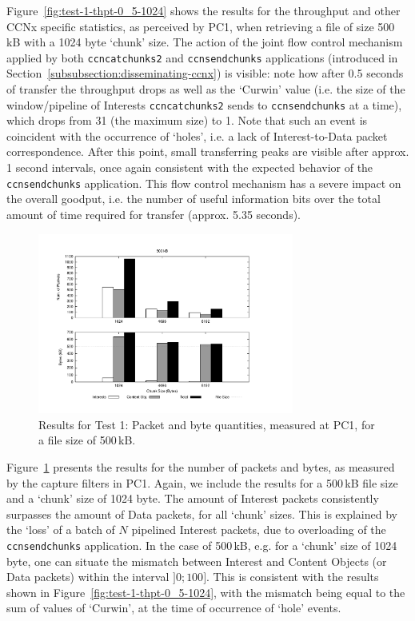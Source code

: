 Figure~\ref{fig:test-1-thpt-0_5-1024} shows the results for the throughput and 
other CCNx specific statistics, as perceived by PC1, when retrieving a file of 
size 500\,kB with a 1024 byte `chunk' size. The action of the joint flow 
control mechanism applied by both \verb+ccncatchunks2+ and \verb+ccnsendchunks+ 
applications (introduced in Section~\ref{subsubsection:disseminating-ccnx}) is 
visible: note how after 0.5 seconds of transfer the throughput drops as well as 
the `Curwin' value (i.e. the size of the window\slash pipeline of Interests 
\verb+ccncatchunks2+ sends to \verb+ccnsendchunks+ at a time), which drops 
from 31 (the maximum size) to 1. Note that such an event is coincident with 
the occurrence of `holes', i.e. a lack of Interest-to-Data packet correspondence. 
After this point, small transferring peaks are visible after approx. 1 second 
intervals, once again consistent with the expected behavior of the 
\verb+ccnsendchunks+ application. This flow control mechanism has 
a severe impact on the overall goodput, i.e. the number of useful information 
bits over the total amount of time required for transfer (approx. 5.35 seconds).\vertbreak

\begin{figure}[h!]

    \centering
    \includegraphics[width=0.75\textwidth]{figures/udp_0_5.pdf}
    \cprotect\caption{Results for Test 1: Packet and byte quantities, measured 
        at PC1, for a file size of 500\,kB.}
    \label{fig:test-1-packtes-bytes}

\end{figure}

Figure~\ref{fig:test-1-packtes-bytes} presents the results for the number of 
packets and bytes, as measured by the capture filters in PC1. Again, we include 
the results for a 500\,kB file size and a `chunk' size of 1024 byte. The amount 
of Interest packets consistently surpasses the amount 
of Data packets, for all `chunk' sizes. This is explained by the 
`loss' of a batch of $N$ pipelined Interest packets, due to overloading of the 
\verb+ccnsendchunks+ application. In the case of 500\,kB, e.g. for a `chunk' 
size of 1024 byte, one can situate the mismatch between Interest and Content 
Objects (or Data packets) within the interval $]0;100]$. This is consistent 
with the results shown in Figure~\ref{fig:test-1-thpt-0_5-1024}, with the 
mismatch being equal to the sum of values of `Curwin', at the time of 
occurrence of `hole' events.\vertbreak

